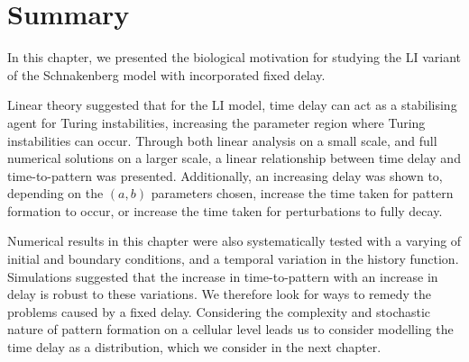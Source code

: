 \section{Summary}

In this chapter, we presented the biological motivation for studying the LI variant of the Schnakenberg model with incorporated fixed delay.

Linear theory suggested that for the LI model, time delay can act as a stabilising agent for Turing instabilities, increasing the parameter region where Turing instabilities can occur. Through both linear analysis on a small scale, and full numerical solutions on a larger scale, a linear relationship between time delay and time-to-pattern was presented. Additionally, an increasing delay was shown to, depending on the $(a,b)$ parameters chosen, increase the time taken for pattern formation to occur, or increase the time taken for perturbations to fully decay.

Numerical results in this chapter were also systematically tested with a varying of initial and boundary conditions, and a temporal variation in the history function. Simulations suggested that the increase in time-to-pattern with an increase in delay is robust to these variations. We therefore look for ways to remedy the problems caused by a fixed delay. Considering the complexity and stochastic nature of pattern formation on a cellular level leads us to consider modelling the time delay as a distribution, which we consider in the next chapter.
